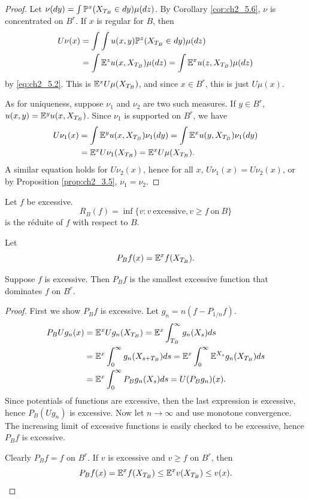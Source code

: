 \begin{proof}
Let $\nu(dy) = \int \P^x(X_{T_B} \in dy)\mu(dz)$. By Corollary \ref{cor:ch2_5.6}, $\nu$ is concentrated on $B^r$. If $x$ is regular for $B$, then
\begin{align*}
    U\nu(x) &= \int\int u(x,y)\P^z(X_{T_B} \in dy)\mu(dz) \\
    &= \int \E^zu(x,X_{T_B})\mu(dz) = \int \E^xu(z,X_{T_B})\mu(dz)
\end{align*}
by \eqref{eq:ch2_5.2}. This is $\E^xU\mu(X_{T_B})$, and since $x \in B^r$, this is just $U\mu(x)$.

As for uniqueness, suppose $\nu_1$ and $\nu_2$ are two such measures. If $y \in B^r$, $u(x,y) = \E^yu(x,X_{T_B})$. Since $\nu_1$ is supported on $B^r$, we have
\begin{align*}
    U\nu_1(x) &= \int \E^yu(x,X_{T_B})\nu_1(dy) = \int \E^xu(y,X_{T_B})\nu_1(dy) \\
    &= \E^xU\nu_1(X_{T_B}) = \E^xU\mu(X_{T_B}).
\end{align*}
A similar equation holds for $U\nu_2(x)$, hence for all $x$, $U\nu_1(x) = U\nu_2(x)$, or by Proposition \ref{prop:ch2_3.5}, $\nu_1 = \nu_2$.
\end{proof}

\begin{definition}\label{def:ch2_6.17}
Let $f$ be excessive.
\[
    R_B(f) = \inf\{v : v~\text{excessive}, v \geq f~\text{on}~B\}
\]
is the r\'eduite of $f$ with respect to $B$.
\end{definition}

\mpagebreak

Let
\begin{equation}\label{eq:ch2_6.4}
    P_Bf(x) = \E^xf(X_{T_B}).
\end{equation}

\begin{proposition}\label{prop:ch2_6.18}
Suppose $f$ is excessive. Then $P_Bf$ is the smallest excessive function that dominates $f$ on $B^r$.
\end{proposition}

\begin{proof}
First we show $P_Bf$ is excessive. Let $g_n = n(f - P_{1/n}f)$.
\begin{align*}
    P_BUg_n(x) &= \E^xUg_n(X_{T_B}) = \E^x\int_{T_B}^\infty g_n(X_s)ds \\
    &= \E^x\int_0^\infty g_n(X_{s+T_B})ds = \E^x\int_0^\infty \E^{X_s}g_n(X_{T_B})ds \\
    &= \E^x\int_0^\infty P_Bg_n(X_s)ds = U(P_Bg_n)(x).
\end{align*}
Since potentials of functions are excessive, then the last expression is excessive, hence $P_B(Ug_n)$ is excessive. Now let $n \to \infty$ and use monotone convergence. The increasing limit of excessive functions is easily checked to be excessive, hence $P_Bf$ is excessive.

Clearly $P_Bf = f$ on $B^r$. If $v$ is excessive and $v \geq f$ on $B^r$, then
\[
    P_Bf(x) = \E^xf(X_{T_B}) \leq \E^xv(X_{T_B}) \leq v(x).
\]
\end{proof}

